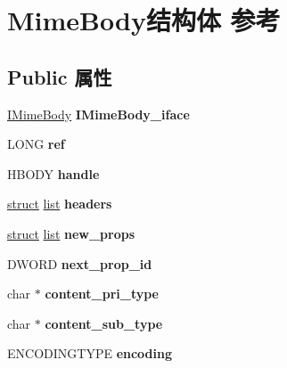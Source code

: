 \hypertarget{struct_mime_body}{}\section{Mime\+Body结构体 参考}
\label{struct_mime_body}
\subsection*{Public 属性}
\begin{DoxyCompactItemize}
\item 
\mbox{\label{struct_mime_body_acc18fe5733a9828e6e01ad39c6dae9cb}} 
\hyperlink{class_i_mime_body}{I\+Mime\+Body} {\bfseries I\+Mime\+Body\+\_\+iface}
\item 
\mbox{\label{struct_mime_body_aeb6a90050ab8bc6cc24950a2cc5d469c}} 
L\+O\+NG {\bfseries ref}
\item 
\mbox{\label{struct_mime_body_a4f86e2df26b83e95c3d257e1ba7e9f7f}} 
H\+B\+O\+DY {\bfseries handle}
\item 
\mbox{\label{struct_mime_body_add1bd6d69972030a54e02ac39d5d2c55}} 
\hyperlink{interfacestruct}{struct} \hyperlink{classlist}{list} {\bfseries headers}
\item 
\mbox{\label{struct_mime_body_a4b6c2088bd499e8b6fd00fbbbd1cb012}} 
\hyperlink{interfacestruct}{struct} \hyperlink{classlist}{list} {\bfseries new\+\_\+props}
\item 
\mbox{\label{struct_mime_body_a1f89d9bc9a8e96c081924124231f15ff}} 
D\+W\+O\+RD {\bfseries next\+\_\+prop\+\_\+id}
\item 
\mbox{\label{struct_mime_body_ad9da5861ecc9378d4da153ff34dfe96c}} 
char $\ast$ {\bfseries content\+\_\+pri\+\_\+type}
\item 
\mbox{\label{struct_mime_body_a3845ccadc945367f536c7e544d8f5f24}} 
char $\ast$ {\bfseries content\+\_\+sub\+\_\+type}
\item 
\mbox{\label{struct_mime_body_a254f1fe4fb47f15fd5f2438f428d1be8}} 
E\+N\+C\+O\+D\+I\+N\+G\+T\+Y\+PE {\bfseries encoding}

\end{DoxyCompactItemize}
